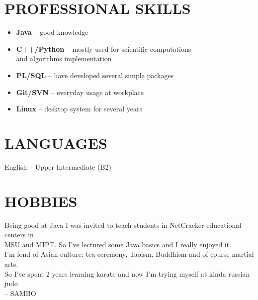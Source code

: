 \documentclass[margin,12pt]{res}
\begin{document}
\begin{resume}
\section{PROFESSIONAL SKILLS}
\begin{itemize} \itemsep -2pt
  \item \textbf{Java} -- good knowledge\\
  \item \textbf{C++/Python} -- mostly used for scientific computations\\
 and algorithms implementation\\
  \item \textbf{PL/SQL} -- have developed several simple packages\\
  \item \textbf{Git/SVN} -- everyday usage at workplace\\
  \item \textbf{Linux} -- desktop system for several years
\end{itemize}
\section{LANGUAGES} 
English -- Upper Intermediate (B2)
\section{HOBBIES}
Being good at Java I was invited to teach students in NetCracker
educational centers in\\
 MSU and MIPT. So I've lectured some Java basics
and I really enjoyed it.\\
I'm fond of Asian culture: tea ceremony, Taoism, Buddhism and of course
martial arts.\\
So I've spent 2 years learning
karate and now I'm trying myself at kinda russian judo\\ -- SAMBO

\end{resume}
\end{document}
